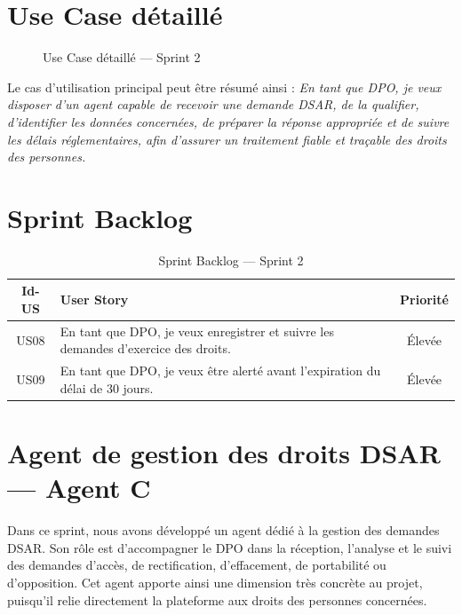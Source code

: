 \documentclass[12pt,a4paper]{report}
\begin{document}
\section{Use Case détaillé}

\begin{figure}[H]
\centering
{}
\caption{Use Case détaillé --- Sprint 2}
\label{fig:use_case_sprint2}
\end{figure}

Le cas d'utilisation principal peut être résumé ainsi : \textit{En tant que DPO, je veux disposer d'un agent capable de recevoir une demande DSAR, de la qualifier, d'identifier les données concernées, de préparer la réponse appropriée et de suivre les délais réglementaires, afin d'assurer un traitement fiable et traçable des droits des personnes.}

\section{Sprint Backlog}

\begin{table}[H]
\centering
\caption{Sprint Backlog --- Sprint 2}
\label{tab:backlog_sprint2}
\begin{tabularx}{\textwidth}{|c|X|c|}
\hline
\textbf{Id-US} & \textbf{User Story} & \textbf{Priorité} \\
\hline
US08 & En tant que DPO, je veux enregistrer et suivre les demandes d'exercice des droits. & Élevée \\
\hline
US09 & En tant que DPO, je veux être alerté avant l'expiration du délai de 30 jours. & Élevée \\
\hline
\end{tabularx}
\end{table}

\section{Agent de gestion des droits DSAR --- Agent C}

Dans ce sprint, nous avons développé un agent dédié à la gestion des demandes DSAR. Son rôle est d'accompagner le DPO dans la réception, l'analyse et le suivi des demandes d'accès, de rectification, d'effacement, de portabilité ou d'opposition. Cet agent apporte ainsi une dimension très concrète au projet, puisqu'il relie directement la plateforme aux droits des personnes concernées.
\end{document}
